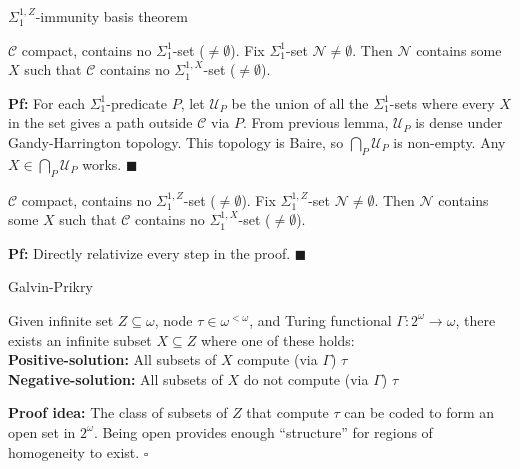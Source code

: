 \begin{frame}{$\Sigma_1^{1,Z}$-immunity basis theorem}
  \begin{thm*}
    $\mathcal{C}$ compact, contains no $\Sigma_1^{1}$-set
    ($\neq\emptyset$). Fix $\Sigma_1^{1}$-set
    $\mathcal{N}\neq\emptyset$. Then $\mathcal{N}$ contains some $X$ such
    that $\mathcal{C}$ contains no $\Sigma_1^{1,X}$-set ($\neq\emptyset$).
  \end{thm*}
  \textbf{Pf:} For each $\Sigma_1^{1}$-predicate $P$, let $\mathcal{U}_P$
  be the union of all the $\Sigma_1^{1}$-sets where every $X$ in the set
  gives a path outside $\mathcal{C}$ via $P$. From previous lemma,
  $\mathcal{U}_P$ is dense under Gandy-Harrington topology. This topology
  is Baire, so $\bigcap_P\mathcal{U}_P$ is non-empty. Any
  $X\in\bigcap_P\mathcal{U}_P$ works. $\blacksquare$

  \vspace{0.5em}
  \begin{coro*}
    $\mathcal{C}$ compact, contains no $\Sigma_1^{1,Z}$-set
    ($\neq\emptyset$). Fix $\Sigma_1^{1,Z}$-set
    $\mathcal{N}\neq\emptyset$. Then $\mathcal{N}$ contains some $X$ such
    that $\mathcal{C}$ contains no $\Sigma_1^{1,X}$-set ($\neq\emptyset$).
  \end{coro*}
  \textbf{Pf:} Directly relativize every step in the proof.
  $\blacksquare$
\end{frame}

\begin{frame}{Galvin-Prikry}
  \begin{fact*}
    Given infinite set $Z\subseteq\omega$, node $\tau\in\omega^{<\omega}$,
    and Turing functional $\Gamma:2^\omega\rightarrow\omega$, there exists
    an infinite subset $X\subseteq Z$ where one of these holds:\\

    \vspace{1em}
    \textbf{Positive-solution:} All subsets of $X$ compute (via $\Gamma$)
    $\tau$ \\
    \textbf{Negative-solution:} All subsets of $X$ do not compute (via
    $\Gamma$) $\tau$
  \end{fact*}

  \vspace{1em}
  \textbf{Proof idea:} The class of subsets of $Z$ that
  compute $\tau$ can be coded to form an open set in $2^\omega$. Being
  open provides enough ``structure'' for regions of homogeneity to exist.
  $\square$
\end{frame}


